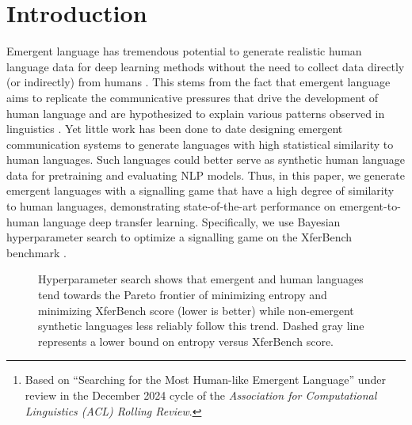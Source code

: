 \begin{abstract}
In this chapter, we design a signalling game-based emergent communication environment to generate state-of-the-art emergent languages in terms of similarity to human language.
This is done with hyperparameter optimization, using XferBench as the objective function.
XferBench quantifies the statistical similarity of emergent language to human language by measuring its suitability for deep transfer learning to human language.
Additionally, we demonstrate the predictive power of entropy on the transfer learning performance of an emergent language as well as validate previous results on the entropy-minimization properties of emergent communication systems.
Finally, we report generalizations regarding what hyperparameters produce more realistic emergent languages, that is, ones which transfer better to human language.
\unskip\footnote{Based on ``Searching for the Most Human-like Emergent Language'' under review in the December 2024 cycle of the \emph{Association for Computational Linguistics (ACL) Rolling Review}.}
\end{abstract}

\section{Introduction}
Emergent language has tremendous potential to generate realistic human language data for deep learning methods without the need to collect data directly (or indirectly) from humans \citep{boldt2024review}.
This stems from the fact that emergent language aims to replicate the communicative pressures that drive the development of human language and are hypothesized to explain various patterns observed in linguistics \citep{sep-linguistics}.
Yet little work has been done to date designing emergent communication systems to generate languages with high statistical similarity to human languages.
Such languages could better serve as synthetic human language data for pretraining and evaluating NLP models.
Thus, in this paper, we generate emergent languages with a signalling game that have a high degree of similarity to human languages, demonstrating state-of-the-art performance on emergent-to-human language deep transfer learning.
Specifically, we use Bayesian hyperparameter search to optimize a signalling game on the XferBench benchmark \citep{xferbench}.

\begin{figure}
  \centering
  \caption{Hyperparameter search shows that emergent and human languages tend towards the Pareto frontier of minimizing entropy and minimizing XferBench score (lower is better) while non-emergent synthetic languages less reliably follow this trend.  Dashed gray line represents a lower bound on entropy versus XferBench score.}
  \unskip\label{hpo:fig:ent-xb}
\end{figure}

